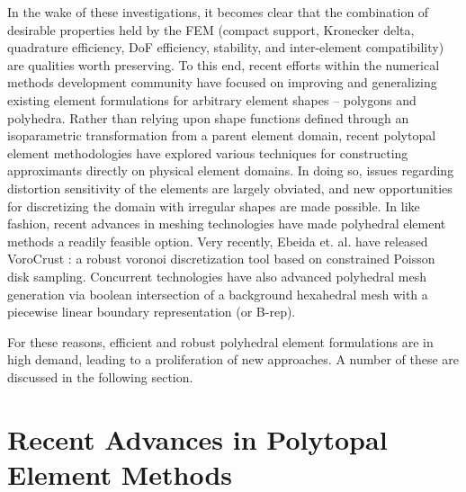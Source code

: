 	In the wake of these investigations, it becomes clear that the combination of desirable properties held by the FEM (compact support, Kronecker delta, quadrature efficiency, DoF efficiency, stability, and inter-element compatibility) are qualities worth preserving. To this end, recent efforts within the numerical methods development community have focused on improving and generalizing existing element formulations for arbitrary element shapes -- polygons and polyhedra. Rather than relying upon shape functions defined through an isoparametric transformation from a parent element domain, recent polytopal element methodologies have explored various techniques for constructing approximants directly on physical element domains. In doing so, issues regarding distortion sensitivity of the elements are largely obviated, and new opportunities for discretizing the domain with irregular shapes are made possible.
	In like fashion, recent advances in meshing technologies have made polyhedral element methods a readily feasible option. Very recently, Ebeida et. al. have released VoroCrust \cite{Ebeida:17}: a robust voronoi discretization tool based on constrained Poisson disk sampling. Concurrent technologies have also advanced polyhedral mesh generation via boolean intersection of a background hexahedral mesh with a piecewise linear boundary representation (or B-rep).

	For these reasons, efficient and robust polyhedral element formulations are in high demand, leading to a proliferation of new approaches. A number of these are discussed in the following section.

\section{Recent Advances in Polytopal Element Methods} %


